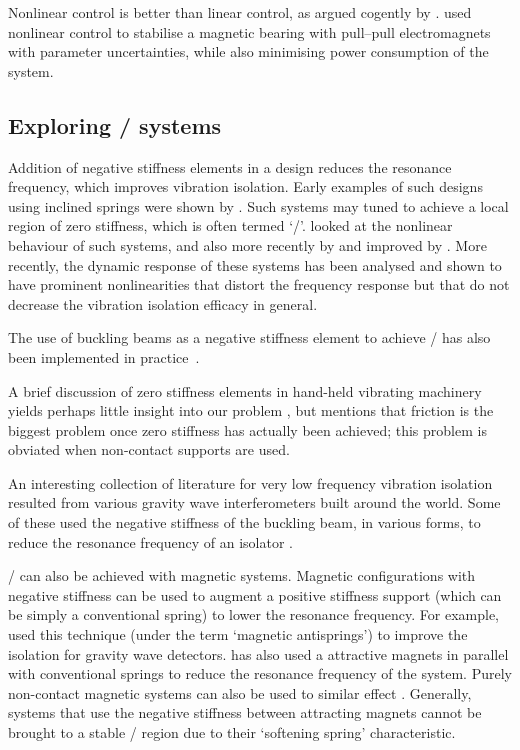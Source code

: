 Nonlinear control is better than linear control, as argued cogently by
\textcite{kokotovic1992}. \textcite{queiroz2007} used nonlinear
control to stabilise a magnetic bearing with pull--pull electromagnets
with parameter uncertainties, while also minimising power consumption
of the system.


\subsection{Exploring \qzs/ systems}

Addition of negative stiffness elements in a design reduces the resonance
frequency, which improves vibration isolation. Early examples of such designs
using inclined springs were shown by \textcite{molyneux1957}. Such systems may
tuned to achieve a local region of zero stiffness, which is often termed
`\qzs/'. \textcite{alabuzhev1989} looked at the nonlinear behaviour of such
systems, and also more recently by
\textcite{carrella2006,carrella2007,carrella2008} and improved by
\textcite{kovacic2008}. More recently, the dynamic response of these systems
has been analysed \parencite{carrella2009,carrella2008thesis} and shown to
have prominent nonlinearities that distort the frequency response but that do
not decrease the vibration isolation efficacy in general.

The use of buckling beams as a negative stiffness element to achieve \qzs/ has
also been implemented in practice~\cite{platus1999,tarnai2003,lee2007}.

A brief discussion of zero stiffness elements in hand-held vibrating
machinery yields perhaps little insight into our problem
\cite{sokolov2007}, but mentions that friction is the biggest problem
once zero stiffness has actually been achieved; this problem is
obviated when non-contact supports are used.

An interesting collection of literature for very low frequency vibration
isolation resulted from various gravity wave interferometers built around the
world. Some of these used the negative stiffness of the buckling beam, in
various forms, to reduce the resonance frequency of an isolator
\cite{cella2005}.

\QZS/ can also be achieved with magnetic systems. Magnetic configurations with
negative stiffness can be used to augment a positive stiffness support (which
can be simply a conventional spring) to lower the resonance frequency. For
example, \textcite{beccaria1997} used this technique (under the term `magnetic
antisprings') to improve the isolation for gravity wave detectors.
\textcite{carrella2007a,carrella2008} has also used a attractive magnets in
parallel with conventional springs to reduce the resonance frequency of the
system. Purely non-contact magnetic systems can also be used to similar effect
\cite{robertson2006,robertson2007}. Generally, systems that use the negative
stiffness between attracting magnets cannot be brought to a stable \qzs/
region due to their `softening spring' characteristic.

